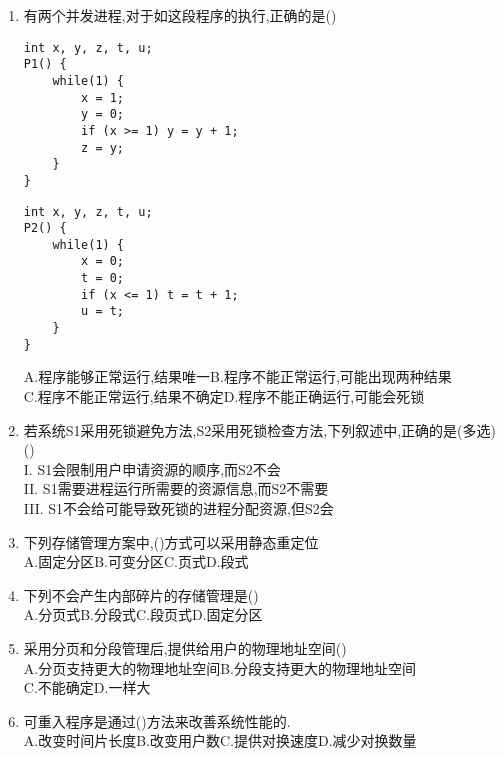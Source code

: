 \documentclass[12pt, a4paper, oneside, UTF8]{ctexbook}
\begin{document}
\begin{enumerate}
    \item 有两个并发进程,对于如这段程序的执行,正确的是() 
\begin{center}
    \begin{minipage}[t]{0.45\textwidth}
        \begin{lstlisting}
int x, y, z, t, u;
P1() {
    while(1) {
        x = 1;
        y = 0;
        if (x >= 1) y = y + 1;
        z = y;
    }
}
    \end{lstlisting}
\end{minipage}
\hfil
\begin{minipage}[t]{0.45\textwidth}
    \begin{lstlisting}
int x, y, z, t, u;
P2() {
    while(1) {
        x = 0;
        t = 0;
        if (x <= 1) t = t + 1;
        u = t;
    }
}
            \end{lstlisting}
        \end{minipage}
    \end{center}
    A.程序能够正常运行,结果唯一\qquad B.程序不能正常运行,可能出现两种结果\\
    C.程序不能正常运行,结果不确定\qquad D.程序不能正确运行,可能会死锁


    \item 若系统S1采用死锁避免方法,S2采用死锁检查方法,下列叙述中,正确的是(多选)() \\
    I. S1会限制用户申请资源的顺序,而S2不会 \\
    II. S1需要进程运行所需要的资源信息,而S2不需要 \\
    III. S1不会给可能导致死锁的进程分配资源,但S2会

    \item 下列存储管理方案中,()方式可以采用静态重定位 \\
    A.固定分区\qquad B.可变分区\qquad C.页式\qquad D.段式

    \item 下列不会产生内部碎片的存储管理是() \\
    A.分页式\qquad B.分段式\qquad C.段页式\qquad D.固定分区

    \item 采用分页和分段管理后,提供给用户的物理地址空间() \\
    A.分页支持更大的物理地址空间\qquad B.分段支持更大的物理地址空间 \\
    C.不能确定\qquad D.一样大

    \item 可重入程序是通过()方法来改善系统性能的. \\
    A.改变时间片长度\qquad B.改变用户数\qquad C.提供对换速度\qquad D.减少对换数量 


\end{enumerate}
\end{document}
